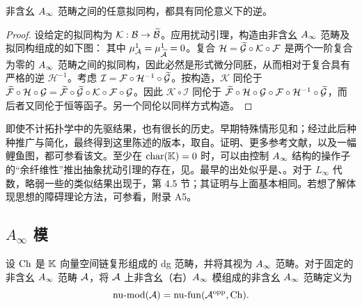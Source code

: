 \begin{corollary}\label{st:1.14}
非含幺 $A_\infty$ 范畴之间的任意拟同构，都具有同伦意义下的逆。
\end{corollary}
\begin{proof}
设给定的拟同构为 $\mathcal K:\mathcal B\to\widetilde{\mathcal B}$。应用扰动引理，构造由非含幺 $A_\infty$ 范畴及拟同构组成的如下图：
其中 $\mu^1_{\mathcal A}=\mu^1_{\widetilde{\mathcal A}}=0$。复合 $\mathcal H=\widetilde{\mathcal G}\circ\mathcal K\circ\mathcal F$ 是两个一阶复合为零的 $A_\infty$ 范畴之间的拟同构，因此必然是形式微分同胚，从而相对于复合具有严格的逆 $\mathcal H^{-1}$。考虑 $\mathcal I=\mathcal F\circ\mathcal H^{-1}\circ\widetilde{\mathcal G}$。按构造，$\mathcal K$ 同伦于 $\widetilde{\mathcal F}\circ\mathcal H\circ\mathcal G=\widetilde{\mathcal F}\circ\widetilde{\mathcal G}\circ\mathcal K\circ\mathcal F\circ\mathcal G$。因此 $\mathcal K\circ\mathcal I$ 同伦于 $\widetilde{\mathcal F}\circ\mathcal H\circ\mathcal G\circ\mathcal F\circ\mathcal H^{-1}\circ\widetilde{\mathcal G}$，而后者又同伦于恒等函子。另一个同伦以同样方式构造。
\end{proof}

\begin{note}\label{st:1.15}
即使不计拓扑学中的先驱结果，也有很长的历史。早期特殊情形见和；经过此后种种推广与简化，最终得到这里陈述的版本，取自。证明、更多参考文献，以及一幅鲤鱼图，都可参看该文。至少在 $\operatorname{char}(\mathbb K)=0$ 时，可以由控制 $A_\infty$ 结构的操作子的“余纤维性”推出抽象扰动引理的存在，见。最早的出处似乎是、。对于 $L_\infty$ 代数，略弱一些的类似结果出现于，第 4.5 节；其证明与上面基本相同。若想了解体现思想的障碍理论方法，可参看，附录 A5。
\end{note}

\clearpage
\subsection{\texorpdfstring{$A_\infty$}{A∞} 模}\label{sec:1j}
\begin{definition*}
设 $\operatorname{Ch}$ 是 $\mathbb K$ 向量空间链复形组成的 dg 范畴，并将其视为 $A_\infty$ 范畴。对于固定的非含幺 $A_\infty$ 范畴 $\mathcal A$，将 $\mathcal A$ 上非含幺（右）$A_\infty$ 模组成的非含幺 $A_\infty$ 范畴定义为
\[
\operatorname{nu\text{-}mod}(\mathcal A)=\operatorname{nu\text{-}fun}(\mathcal A^{\mathrm{opp}},\operatorname{Ch}).
\]
\end{definition*}

